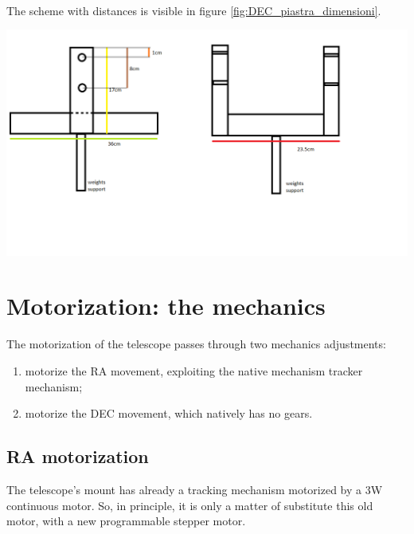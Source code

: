 \documentclass{article}
\begin{document}
\begin{multicols}{2}
\begin{minipage}
            \label{fig:piastra_particular}
        \end{minipage}
        \\
        The scheme with distances is visible in figure \ref{fig:DEC_piastra_dimensioni}.
        \\
        \begin{minipage}
            {0.5\textwidth}
            \centering
            \includegraphics[scale=0.75]{images/DEC_piastra_dimensioni.png}
            \label{fig:DEC_piastra_dimensioni}
        \end{minipage}



        \section{Motorization: the mechanics}
        The motorization of the telescope passes through two mechanics adjustments:
        \begin{enumerate}
            \item motorize the RA movement, exploiting the native mechanism tracker mechanism;
            \item motorize the DEC movement, which natively has no gears.
        \end{enumerate}

        \subsection{RA motorization}
        The telescope's mount has already a tracking mechanism motorized by a 3W continuous motor.
        So, in principle, it is only a matter of substitute this old motor, with a new programmable stepper motor.


\end{multicols}
\end{document}
